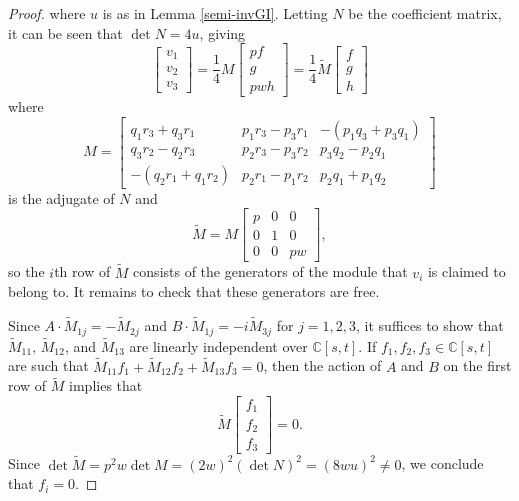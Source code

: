 \documentclass[a4paper,reqno]{amsart}
\theoremstyle{definition}
\theoremstyle{remark} \newtheorem{remark}[theorem]{Remark}
\numberwithin{equation}{section}
\begin{document}
\begin{proof}
    where \(u\) is as in Lemma \ref{semi-invGI}. Letting \(N\) be the coefficient matrix, it can be seen that \(\det N = 4u\), giving
    \begin{equation*}
        \begin{bmatrix}
            v_1 \\
            v_2 \\
            v_3
        \end{bmatrix}
        = \frac{1}{4}M
        \begin{bmatrix}
            pf \\
            g \\
            pwh
        \end{bmatrix} =
        \frac{1}{4} \tilde{M}
        \begin{bmatrix}
            f \\
            g \\ 
            h
        \end{bmatrix}
    \end{equation*}
    where
    \begin{equation*}
        M = 
        \begin{bmatrix}
            q_1r_3+q_3r_1 & p_1r_3 - p_3r_1 & -(p_1q_3+p_3q_1) \\
            q_3r_2-q_2r_3 & p_2r_3 - p_3r_2 & p_3q_2-p_2q_1 \\
            -(q_2r_1+q_1r_2) & p_2r_1 - p_1r_2 & p_2q_1+p_1q_2
        \end{bmatrix}
    \end{equation*}
    is the adjugate of \(N\) and
    \begin{equation*}
        \tilde{M} = M
        \begin{bmatrix}
            p & 0 & 0 \\
            0 & 1 & 0 \\
            0 & 0 & pw
        \end{bmatrix},
    \end{equation*}
    so the \(i\)th row of \(\tilde{M}\) consists of the generators of the module that \(v_i\) is claimed to belong to. It remains to check that these generators are free.
    
    Since \(A \cdot \tilde{M}_{1j} = -\tilde{M}_{2j}\) and \(B \cdot \tilde{M}_{1j} = -i\tilde{M}_{3j}\) for \(j = 1,2,3\), it suffices to show that \(\tilde{M}_{11},\, \tilde{M}_{12}\), and \(\tilde{M}_{13}\) are linearly independent over \(\mathbb{C}[s,t]\). If \(f_1, f_2, f_3 \in \mathbb{C}[s,t]\) are such that \(\tilde{M}_{11}f_1 + \tilde{M}_{12}f_2 + \tilde{M}_{13}f_3 = 0 \), then the action of \(A\) and \(B\) on the first row of \(\tilde{M}\) implies that 
    \begin{equation*}
        \tilde{M}
        \begin{bmatrix}
            f_1 \\ 
            f_2 \\ 
            f_3
        \end{bmatrix}
        = 0.
    \end{equation*}
    Since \(\det \tilde{M} = p^2w \det M = (2w)^2 (\det N)^2 = (8wu)^2 \neq 0\), we conclude that \(f_i = 0\).
    

\end{proof}
\end{document}
